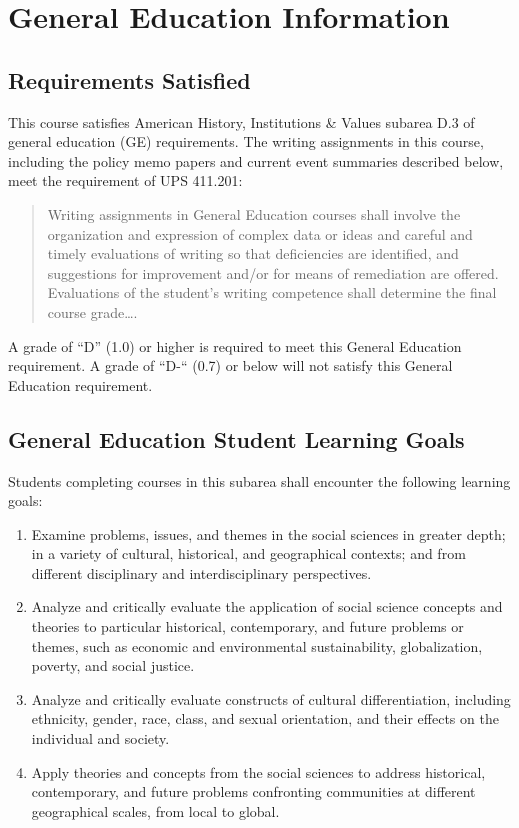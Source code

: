 \documentclass[12pt, letterpaper]{article}
\begin{document}
\section*{General Education Information}

\subsection*{Requirements Satisfied}

	This course satisfies American History, Institutions \& Values subarea D.3 of general education (GE) requirements. The writing assignments in this course, including the policy memo papers and current event summaries described below, meet the requirement of UPS 411.201: 
	\begin{quote}Writing assignments in General Education courses shall involve the organization and expression of complex data or ideas and careful and timely evaluations of writing so that deficiencies are identified, and suggestions for improvement and/or for means of remediation are offered. Evaluations of the student's writing competence shall determine the final course grade\ldots .\end{quote}
    A grade of “D” (1.0) or higher is required to meet this General Education requirement. A grade of “D-“ (0.7) or below will not satisfy this General Education requirement.

\subsection*{General Education Student Learning Goals}

	Students completing courses in this subarea shall encounter the following learning goals:

\begin{enumerate}
    \item Examine problems, issues, and themes in the social sciences in greater depth; in a variety of cultural, historical, and geographical contexts; and from different disciplinary and interdisciplinary perspectives.
    \item Analyze and critically evaluate the application of social science concepts and theories to particular historical, contemporary, and future problems or themes, such as economic and environmental sustainability, globalization, poverty, and social justice.
    \item Analyze and critically evaluate constructs of cultural differentiation, including ethnicity, gender, race, class, and sexual orientation, and their effects on the individual and society.
    \item Apply theories and concepts from the social sciences to address historical, contemporary, and future problems confronting communities at different geographical scales, from local to global.
\end{enumerate}
\end{document}
